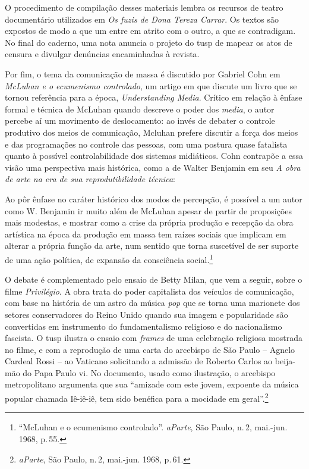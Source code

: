 O procedimento de compilação desses materiais lembra os recursos de
teatro documentário utilizados em {\it Os fuzis de Dona Tereza Carrar}.
Os textos são expostos de modo a que um entre em atrito com o outro, a
que se contradigam. No final do caderno, uma nota anuncia o projeto do
{\sc tusp} de mapear os atos de censura e divulgar denúncias encaminhadas à
revista.

Por fim, o tema da comunicação de massa é discutido por Gabriel Cohn em
{\it McLuhan e o ecumenismo controlado}, um artigo em que discute um
livro que se tornou referência para a época, {\it Understanding Media}.
Crítico em relação à ênfase formal e técnica de McLuhan quando descreve
o poder dos {\it media}, o autor percebe aí um movimento de
deslocamento: ao invés de debater o controle produtivo dos meios de
comunicação, Mcluhan prefere discutir a força dos meios e das
programações no controle das pessoas, com uma postura quase fatalista
quanto à possível controlabilidade dos sistemas midiáticos. Cohn
contrapõe a essa visão uma perspectiva mais histórica, como a de Walter
Benjamin em seu {\it A obra de arte na era de sua reprodutibilidade
técnica}:

\startblockquote
Ao pôr ênfase no caráter histórico dos modos de percepção, é possível a
um autor como W. Benjamin ir muito além de McLuhan apesar de partir de
proposições mais modestas, e mostrar como a crise da própria produção e
recepção da obra artística na época da produção em massa tem raízes
sociais que implicam em alterar a própria função da arte, num sentido
que torna suscetível de ser suporte de uma ação política, de expansão da
consciência social.\footnote{“McLuhan e o ecumenismo controlado”.
  {\it aParte}, São Paulo, n.\,2, mai.-jun. 1968, p.\,55.}
\stopblockquote

O debate é complementado pelo ensaio de Betty Milan, que vem a seguir,
sobre o filme {\it Privilégio}. A obra trata do poder capitalista dos
veículos de comunicação, com base na história de um astro da música
{\it pop} que se torna uma marionete dos setores conservadores do Reino
Unido quando sua imagem e popularidade são convertidas em instrumento do
fundamentalismo religioso e do nacionalismo fascista. O {\sc tusp} ilustra o
ensaio com {\it frames} de uma celebração religiosa mostrada no filme, e
com a reprodução de uma carta do arcebispo de São Paulo -- Agnelo Cardeal
Rossi -- ao Vaticano solicitando a admissão de Roberto Carlos ao
beija-mão do Papa Paulo {\sc vi}. No documento, usado como ilustração, o
arcebispo metropolitano argumenta que sua “amizade com este jovem,
expoente da música popular chamada Iê-iê-iê, tem sido benéfica para a
mocidade em geral”.\footnote{{\it aParte}, São Paulo, n.\,2, mai.-jun.
  1968, p.\,61.}

